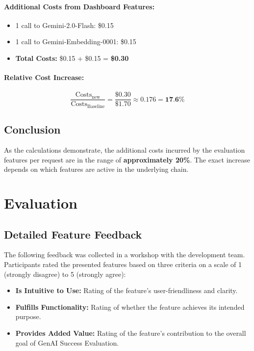 \documentclass[
	english,
	ruledheaders=section,%
	class=report,%
	thesis={type=bachelor},%
	accentcolor=1b,%
	custommargins=true,%
	marginpar=false,%
	parskip=half-,%
	fontsize=11pt,%
	DIV=14,
]{tudapub}
\begin{document}
\paragraph{Additional Costs from Dashboard Features:}
\begin{itemize}
    \item 1 call to Gemini-2.0-Flash: \$0.15
    \item 1 call to Gemini-Embedding-0001: \$0.15
    \item \textbf{Total Costs:} \$0.15 + \$0.15 = \textbf{\$0.30}
\end{itemize}

\paragraph{Relative Cost Increase:}
\begin{equation*}
\frac{\text{Costs}_\text{new}}{\text{Costs}_\text{Baseline}} = \frac{\$0.30}{\$1.70} \approx 0.176 = \textbf{17.6\%}
\end{equation*}

\subsection*{Conclusion}
As the calculations demonstrate, the additional costs incurred by the evaluation features per request are in the range of \textbf{approximately 20\%}. The exact increase depends on which features are active in the underlying chain.

\section*{Evaluation}
\subsection*{Detailed Feature Feedback}

The following feedback was collected in a workshop with the development team. Participants rated the presented features based on three criteria on a scale of 1 (strongly disagree) to 5 (strongly agree):
\begin{itemize}
    \item \textbf{Is Intuitive to Use:} Rating of the feature's user-friendliness and clarity.
    \item \textbf{Fulfills Functionality:} Rating of whether the feature achieves its intended purpose.
    \item \textbf{Provides Added Value:} Rating of the feature's contribution to the overall goal of GenAI Success Evaluation.
\end{itemize}
\end{document}
